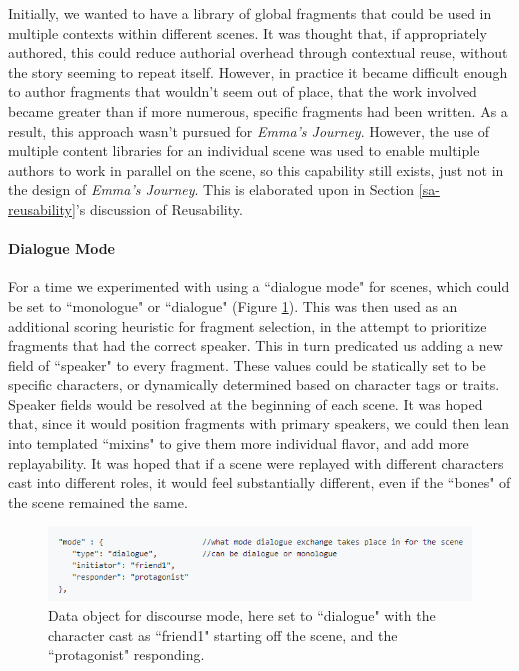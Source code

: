 Initially, we wanted to have a library of global fragments that could be used in multiple contexts within different scenes. It was thought that, if appropriately authored, this could reduce authorial overhead through contextual reuse, without the story seeming to repeat itself. However, in practice it became difficult enough to author fragments that wouldn't seem out of place, that the work involved became greater than if more numerous, specific fragments had been written. As a result, this approach wasn't pursued for \textit{Emma's Journey}. However, the use of multiple content libraries for an individual scene was used to enable multiple authors to work in parallel on the scene, so this capability still exists, just not in the design of \textit{Emma's Journey}. This is elaborated upon in Section \ref{sa-reusability}'s discussion of Reusability.

\paragraph{Dialogue Mode}

For a time we experimented with using a ``dialogue mode" for scenes, which could be set to ``monologue" or ``dialogue" (Figure \ref{fig:discourse-data}). This was then used as an additional scoring heuristic for fragment selection, in the attempt to prioritize fragments that had the correct speaker. This in turn predicated us adding a new field of ``speaker" to every fragment. These values could be statically set to be specific characters, or dynamically determined based on character tags or traits. Speaker fields would be resolved at the beginning of each scene. It was hoped that, since it would position fragments with primary speakers, we could then lean into templated ``mixins" to give them more individual flavor, and add more replayability. It was hoped that if a scene were replayed with different characters cast into different roles, it would feel substantially different, even if the ``bones" of the scene remained the same.


\begin{figure}
    \centering
    \includegraphics[width=\textwidth]{figures/3-StoryAssembler/data-object-2.png}
    \caption{Data object for discourse mode, here set to ``dialogue" with the character cast as ``friend1" starting off the scene, and the ``protagonist" responding.}
    \label{fig:discourse-data}
\end{figure}

